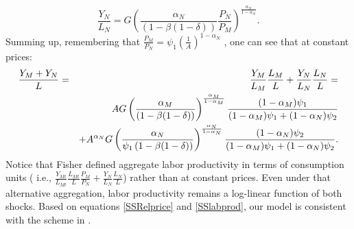 \documentclass[12pt,fleqn]{article}
\begin{document}
\begin{equation}
\frac{Y_{N}}{L_{N}}=G\left( \frac{\alpha _{N}}{\left( 1-\beta
(1-\delta )\right) }\frac{P_{N}}{P_{M}}\right) ^{\frac{\alpha
_{N}}{1-\alpha _{N}}}.
\end{equation}%
Summing up, remembering that $\frac{P_{M}}{P_{N}}=\psi _{1}\left(
\frac{1}{A}\right) ^{1-\alpha _{N}}$ , one can see that at constant
prices:
\begin{eqnarray}
\frac{Y_{M}+Y_{N}}{L} &=&\frac{Y_{M}}{L_{M}}\frac{L_{M}}{L}+\frac{Y_{N}}{%
L_{N}}\frac{L_{N}}{L}= \nonumber \\ \label{SSlabprod} &&AG\left(
\frac{\alpha _{M}}{\left( 1-\beta (1-\delta )\right) }\right)
^{\frac{\alpha _{M}}{1-\alpha _{M}}}\frac{(1-\alpha _{M})\psi _{1}}{%
(1-\alpha _{M})\psi _{1}+(1-\alpha _{N})\psi _{2}} \\
&&+ A^{\alpha _{N}} G \left( \frac{\alpha _{N}}{\psi _{1}\left(
1-\beta (1-\delta )\right) }\right) ^{\frac{\alpha _{N}}{1-\alpha
_{N}}}\frac{(1-\alpha _{N})\psi _{2}}{(1-\alpha _{M})\psi
_{1}+(1-\alpha _{N})\psi _{2}}.
\end{eqnarray}%
Notice that Fisher defined aggregate labor productivity in terms of
consumption units
( i.e., $\frac{Y_{Mt}}{L_{Mt}}\frac{L_{Mt}}{L}\frac{P_{M}}{P_{N}}+\frac{Y_{N}%
}{L_{N}}\frac{L_{N}}{L}$) rather than at constant prices. Even under
that alternative aggregation, labor productivity remains a
log-linear function of both shocks. Based on equations
\ref{SSRelprice} and \ref{SSlabprod}, our model is consistent with
the scheme in . 



\clearpage


\clearpage
\end{document}
